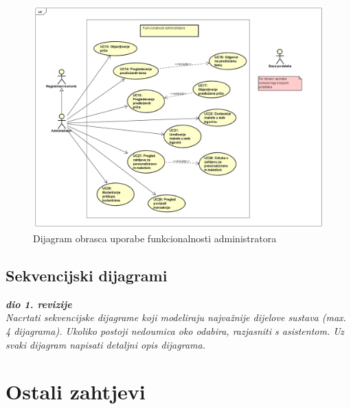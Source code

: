 					\begin{figure}
						\centering
						\includegraphics[scale=0.34]{"slike/Funkcionalnost administratora"}
						\caption{Dijagram obrasca uporabe funkcionalnosti administratora}
						\label{fig:funkcionalnost-administratora}
					\end{figure}
					
					
				\eject		
				
			\subsection{Sekvencijski dijagrami}
				
				\textbf{\textit{dio 1. revizije}}\\
				
				\textit{Nacrtati sekvencijske dijagrame koji modeliraju najvažnije dijelove sustava (max. 4 dijagrama). Ukoliko postoji nedoumica oko odabira, razjasniti s asistentom. Uz svaki dijagram napisati detaljni opis dijagrama.}
				\eject
	
		\section{Ostali zahtjevi}
		
